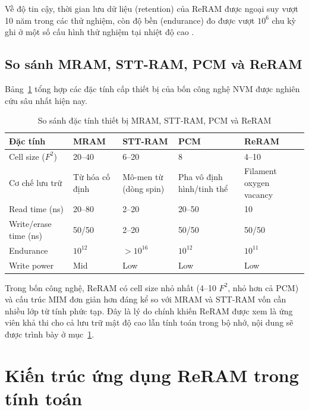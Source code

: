 \documentclass[12pt,a4paper]{article}
\begin{document}
Về độ tin cậy, thời gian lưu dữ liệu (retention) của ReRAM được ngoại suy vượt 10 năm trong các thử nghiệm, còn độ bền (endurance) đo được vượt $10^6$ chu kỳ ghi ở một số cấu hình thử nghiệm tại nhiệt độ cao \cite{meena2014}.

\subsection{So sánh MRAM, STT-RAM, PCM và ReRAM}

Bảng~\ref{tab:pcm-sttram-reram} tổng hợp các đặc tính cấp thiết bị của bốn công nghệ NVM được nghiên cứu sâu nhất hiện nay.

\begin{table}[h]
\centering
\caption{So sánh đặc tính thiết bị MRAM, STT-RAM, PCM và ReRAM \cite{meena2014,kamath2019}}
\label{tab:pcm-sttram-reram}
\begin{tabular}{lp{2.3cm}p{2.3cm}p{2.3cm}p{2.8cm}}
\toprule
\textbf{Đặc tính} & \textbf{MRAM} & \textbf{STT-RAM} & \textbf{PCM} & \textbf{ReRAM} \\
\midrule
Cell size ($F^2$) & 20--40 & 6--20 & 8 & 4--10 \\
Cơ chế lưu trữ & Từ hóa cố định & Mô-men từ (dòng spin) & Pha vô định hình/tinh thể & Filament oxygen vacancy \\
Read time (ns) & 20--80 & 2--20 & 20--50 & 10 \\
Write/erase time (ns) & 50/50 & 2--20 & 50/50 & 50/50 \\
Endurance & $10^{12}$ & $> 10^{16}$ & $10^{12}$ & $10^{11}$ \\
Write power & Mid & Low & Low & Low \\
\bottomrule
\end{tabular}
\end{table}

Trong bốn công nghệ, ReRAM có cell size nhỏ nhất (4--10 $F^2$, nhỏ hơn cả PCM) và cấu trúc MIM đơn giản hơn đáng kể so với MRAM và STT-RAM vốn cần nhiều lớp từ tính phức tạp. Đây là lý do chính khiến ReRAM được xem là ứng viên khả thi cho cả lưu trữ mật độ cao lẫn tính toán trong bộ nhớ, nội dung sẽ được trình bày ở mục~\ref{sec:reram-arch}.

\section{Kiến trúc ứng dụng ReRAM trong tính toán}
\label{sec:reram-arch}
\end{document}
